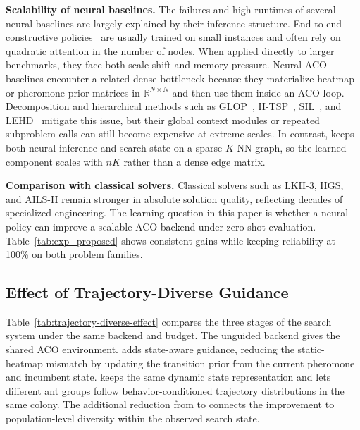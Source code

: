 \smallskip\noindent\textbf{Scalability of neural baselines.}
The failures and high runtimes of several neural baselines are largely explained by their inference structure. End-to-end constructive policies~\cite{attentionmodel,pomo,bq,lehd,invit,sigd} are usually trained on small instances and often rely on quadratic attention in the number of nodes. When applied directly to larger benchmarks, they face both scale shift and memory pressure. Neural ACO baselines encounter a related dense bottleneck because they materialize heatmap or pheromone-prior matrices in $\mathbb{R}^{N\times N}$ and then use them inside an ACO loop. Decomposition and hierarchical methods such as GLOP~\cite{glop}, H-TSP~\cite{htsp}, SIL~\cite{sil}, and LEHD~\cite{lehd} mitigate this issue, but their global context modules or repeated subproblem calls can still become expensive at extreme scales. In contrast, \DyNACS{} keeps both neural inference and search state on a sparse $K$-NN graph, so the learned component scales with $nK$ rather than a dense edge matrix.

\smallskip\noindent\textbf{Comparison with classical solvers.}
Classical solvers such as LKH-3, HGS, and AILS-II remain stronger in absolute solution quality, reflecting decades of specialized engineering. The learning question in this paper is whether a neural policy can improve a scalable ACO backend under zero-shot evaluation. Table~\ref{tab:exp_proposed} shows consistent gains while keeping reliability at 100\% on both problem families.

\subsection{Effect of Trajectory-Diverse Guidance}
\label{sec:trajectory-diverse-effect}

Table~\ref{tab:trajectory-diverse-effect} compares the three stages of the search system under the same backend and budget. The unguided backend gives the shared ACO environment. \DyNACO{} adds state-aware guidance, reducing the static-heatmap mismatch by updating the transition prior from the current pheromone and incumbent state. \DyNACS{} keeps the same dynamic state representation and lets different ant groups follow behavior-conditioned trajectory distributions in the same colony. The additional reduction from \DyNACO{} to \DyNACS{} connects the improvement to population-level diversity within the observed search state.

